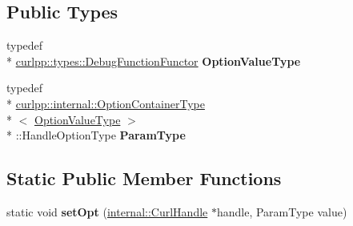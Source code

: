 \subsection*{Public Types}
\begin{DoxyCompactItemize}
\item 
\hypertarget{classcurlpp_1_1internal_1_1OptionSetter_3_01curlpp_1_1types_1_1DebugFunctionFunctor_00_01CURLOPT__DEBUGFUNCTION_01_4_ab6c38d7da41dc49d6694d2417c960bff}{typedef \\*
\hyperlink{classutilspp_1_1Functor}{curlpp\-::types\-::\-Debug\-Function\-Functor} {\bfseries Option\-Value\-Type}}\label{classcurlpp_1_1internal_1_1OptionSetter_3_01curlpp_1_1types_1_1DebugFunctionFunctor_00_01CURLOPT__DEBUGFUNCTION_01_4_ab6c38d7da41dc49d6694d2417c960bff}

\item 
\hypertarget{classcurlpp_1_1internal_1_1OptionSetter_3_01curlpp_1_1types_1_1DebugFunctionFunctor_00_01CURLOPT__DEBUGFUNCTION_01_4_a6c52ae963d9064ddd3eebd92c9a88927}{typedef \\*
\hyperlink{structcurlpp_1_1internal_1_1OptionContainerType}{curlpp\-::internal\-::\-Option\-Container\-Type}\\*
$<$ \hyperlink{classutilspp_1_1Functor}{Option\-Value\-Type} $>$\\*
\-::Handle\-Option\-Type {\bfseries Param\-Type}}\label{classcurlpp_1_1internal_1_1OptionSetter_3_01curlpp_1_1types_1_1DebugFunctionFunctor_00_01CURLOPT__DEBUGFUNCTION_01_4_a6c52ae963d9064ddd3eebd92c9a88927}

\end{DoxyCompactItemize}
\subsection*{Static Public Member Functions}
\begin{DoxyCompactItemize}
\item 
\hypertarget{classcurlpp_1_1internal_1_1OptionSetter_3_01curlpp_1_1types_1_1DebugFunctionFunctor_00_01CURLOPT__DEBUGFUNCTION_01_4_a15fdef23092b4546542a662859e0c495}{static void {\bfseries set\-Opt} (\hyperlink{classcurlpp_1_1internal_1_1CurlHandle}{internal\-::\-Curl\-Handle} $\ast$handle, Param\-Type value)}\label{classcurlpp_1_1internal_1_1OptionSetter_3_01curlpp_1_1types_1_1DebugFunctionFunctor_00_01CURLOPT__DEBUGFUNCTION_01_4_a15fdef23092b4546542a662859e0c495}

\end{DoxyCompactItemize}


